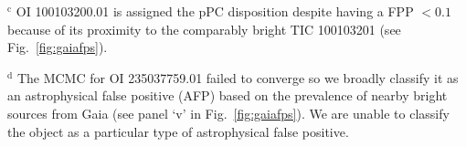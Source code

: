 \begin{landscape}
\begin{table*}
\begin{list}{}{}
\item $^{\text{c}}$ OI 100103200.01 is assigned the pPC disposition despite having a FPP $<0.1$ because of its proximity to the comparably bright TIC 100103201 (see Fig.~\ref{fig:gaiafps}).
  \item $^{\text{d}}$ The MCMC for OI 235037759.01 failed to converge so we broadly classify it as an astrophysical false positive (AFP) based on the prevalence of nearby bright sources from Gaia (see panel `v' in Fig.~\ref{fig:gaiafps}). We are unable to classify the object as a particular type of astrophysical false positive.
  \end{list}
\end{table*}
\clearpage
\end{landscape}
